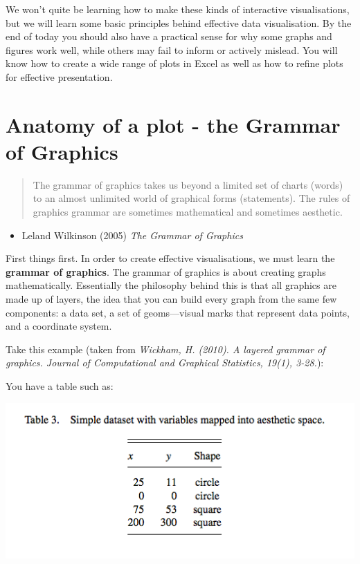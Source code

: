 \documentclass[
]{book}
\providecommand{\tightlist}{%
  \setlength{\itemsep}{0pt}\setlength{\parskip}{0pt}}
\begin{document}
We won't quite be learning how to make these kinds of interactive visualisations, but we will learn some basic principles behind effective data visualisation. By the end of today you should also have a practical sense for why some graphs and figures work well, while others may fail to inform or actively mislead. You will know how to create a wide range of plots in Excel as well as how to refine plots for effective presentation.

\hypertarget{anatomy-of-a-plot---the-grammar-of-graphics}{%
\section{Anatomy of a plot - the Grammar of Graphics}\label{anatomy-of-a-plot---the-grammar-of-graphics}}

\begin{quote}
The grammar of graphics takes us beyond a limited set
of charts (words) to an almost unlimited world of graphical forms (statements).
The rules of graphics grammar are sometimes mathematical and
sometimes aesthetic.
\end{quote}

\begin{itemize}
\tightlist
\item
  Leland Wilkinson (2005) \emph{The Grammar of Graphics}
\end{itemize}

First things first. In order to create effective visualisations, we must learn the \textbf{grammar of graphics}. The grammar of graphics is about creating graphs mathematically. Essentially the philosophy behind this is that all graphics are made up of layers, the idea that you can build every graph from the same few components: a data set, a set of geoms---visual marks that represent data points, and a coordinate system.

Take this example (taken from \emph{Wickham, H. (2010). A layered grammar of graphics. Journal of Computational and Graphical Statistics, 19(1), 3-28.}):

You have a table such as:

\includegraphics{imgs/table.png}
\end{document}
